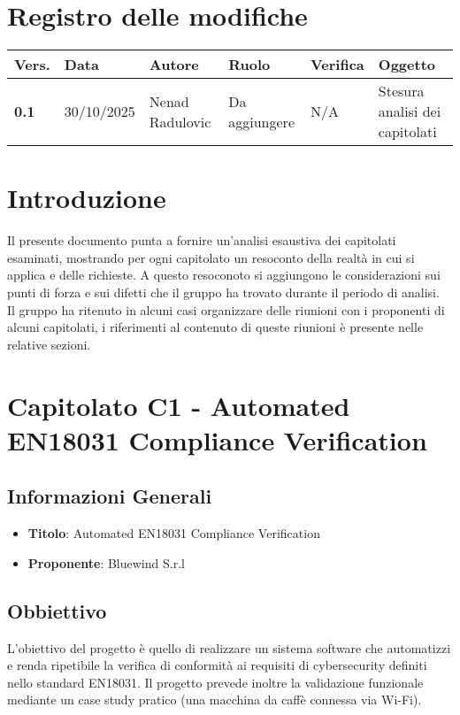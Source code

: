 \documentclass[a4paper,12pt]{article}
\begin{document}
    

    \section*{Registro delle modifiche} {
        \begin{tabularx}{\textwidth}{|l|l|X|l|X|X|}
        \hline
        \textbf{Vers.} & \textbf{Data} & \textbf{Autore} & \textbf{Ruolo} & \textbf{Verifica} & \textbf{Oggetto} \\
        \hline
        \textbf{0.1} & 30/10/2025 & Nenad Radulovic & Da aggiungere & N/A & Stesura analisi dei capitolati \\
        \hline
        \end{tabularx}
    }
    \newpage

    \tableofcontents
    \newpage

    \section{Introduzione}
    Il presente documento punta a fornire un'analisi esaustiva dei capitolati esaminati, mostrando per ogni capitolato un resoconto della realtà in cui si applica e delle richieste. A questo resoconoto si aggiungono le considerazioni sui punti di forza e sui difetti che il gruppo ha trovato durante il periodo di analisi. \\ Il gruppo ha ritenuto in alcuni casi organizzare delle riunioni con i proponenti di alcuni capitolati, i riferimenti al contenuto di queste riunioni è presente nelle relative sezioni.

    \section{Capitolato C1 - Automated EN18031 Compliance Verification}
    \subsection{Informazioni Generali}
        \begin{itemize}
            \item \textbf{Titolo}: Automated EN18031 Compliance Verification
            \item \textbf{Proponente}: Bluewind S.r.l
        \end{itemize}
    \subsection{Obbiettivo}
    L’obiettivo del progetto è quello di realizzare un sistema software che automatizzi e renda ripetibile la verifica di conformità ai requisiti di cybersecurity definiti nello standard EN18031. Il progetto prevede inoltre la validazione funzionale mediante un case study pratico (una macchina da caffè connessa via Wi-Fi).
\end{document}
